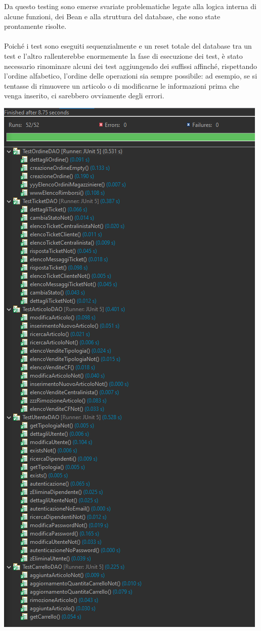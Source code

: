 \documentclass[12pt]{article}
\begin{document}
Da questo testing sono emerse svariate problematiche legate alla logica interna di alcune funzioni, dei Bean e alla struttura del database, che sono state prontamente risolte. \\ \\
Poiché i test sono eseguiti sequenzialmente e un reset totale del database tra un test e l'altro rallenterebbe enormemente la fase di esecuzione dei test, è stato necessario rinominare alcuni dei test aggiungendo dei suffissi affinché, rispettando l'ordine alfabetico, l'ordine delle operazioni sia sempre possibile: ad esempio, se si tentasse di rimuovere un articolo o di modificarne le informazioni prima che venga inserito, ci sarebbero ovviamente degli errori.


\includegraphics[width=\textwidth]{JUnit}
\end{document}
